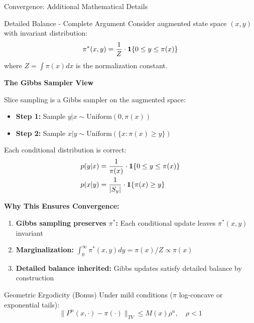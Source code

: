 \documentclass[aspectratio=169]{beamer}
\begin{document}
\begin{frame}{Convergence: Additional Mathematical Details}

	\begin{block}{Detailed Balance - Complete Argument}
		Consider augmented state space $(x, y)$ with invariant distribution:
		$$\pi^*(x, y) = \frac{1}{Z} \cdot \mathbf{1}\{0 \leq y \leq \pi(x)\}$$
		where $Z = \int \pi(x)dx$ is the normalization constant.
	\end{block}

	\textbf{The Gibbs Sampler View}

	Slice sampling is a Gibbs sampler on the augmented space:
	\begin{itemize}
		\item \textbf{Step 1:} Sample $y | x \sim \text{Uniform}(0, \pi(x))$
		\item \textbf{Step 2:} Sample $x | y \sim \text{Uniform}(\{x : \pi(x) \geq y\})$
	\end{itemize}

	Each conditional distribution is correct:
	\begin{align}
		p(y|x) & = \frac{1}{\pi(x)} \cdot \mathbf{1}\{0 \leq y \leq \pi(x)\} \\
		p(x|y) & = \frac{1}{|S_y|} \cdot \mathbf{1}\{\pi(x) \geq y\}
	\end{align}

	\textbf{Why This Ensures Convergence:}
	\begin{enumerate}
		\item \textbf{Gibbs sampling preserves $\pi^*$:} Each conditional update leaves $\pi^*(x,y)$ invariant
		\item \textbf{Marginalization:} $\int_0^\infty \pi^*(x,y)dy = \pi(x)/Z \propto \pi(x)$
		\item \textbf{Detailed balance inherited:} Gibbs updates satisfy detailed balance by construction
	\end{enumerate}

	\begin{block}{Geometric Ergodicity (Bonus)}
		Under mild conditions ($\pi$ log-concave or exponential tails):
		$$\|P^n(x, \cdot) - \pi(\cdot)\|_{TV} \leq M(x)\rho^n, \quad \rho < 1$$
	\end{block}

\end{frame}
\end{document}
